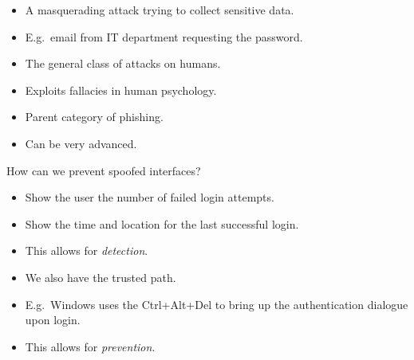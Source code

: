 \begin{frame}
  \begin{definition}[Phishing]
    \begin{itemize}
      \item A masquerading attack trying to collect sensitive data.
      \item E.g.\ email from IT department requesting the password.
    \end{itemize}
  \end{definition}

  \pause{}

  \begin{definition}
    \begin{itemize}
      \item The general class of attacks on humans.
      \item Exploits fallacies in human psychology.
      \item Parent category of phishing.
      \item Can be very advanced.
    \end{itemize}
  \end{definition}
\end{frame}

\begin{frame}
  \begin{exercise}
    How can we prevent spoofed interfaces?
  \end{exercise}
\end{frame}

\begin{frame}
  \begin{example}
    \begin{itemize}
      \item Show the user the number of failed login attempts.
      \item Show the time and location for the last successful login.
      \item This allows for \emph{detection}.
    \end{itemize}
  \end{example}

  \begin{example}
    \begin{itemize}
      \item We also have the trusted path.
      \item E.g.\ Windows uses the Ctrl+Alt+Del to bring up the authentication 
        dialogue upon login.
      \item This allows for \emph{prevention}.
    \end{itemize}
  \end{example}
\end{frame}

